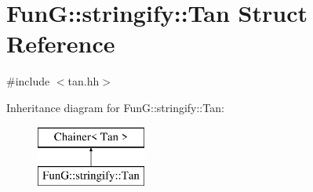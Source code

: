 \hypertarget{structFunG_1_1stringify_1_1Tan}{\section{Fun\-G\-:\-:stringify\-:\-:Tan Struct Reference}
\label{structFunG_1_1stringify_1_1Tan}
}


{\ttfamily \#include $<$tan.\-hh$>$}

Inheritance diagram for Fun\-G\-:\-:stringify\-:\-:Tan\-:\begin{figure}[H]
\begin{center}
\leavevmode
\includegraphics[height=2.000000cm]{structFunG_1_1stringify_1_1Tan}
\end{center}
\end{figure}
